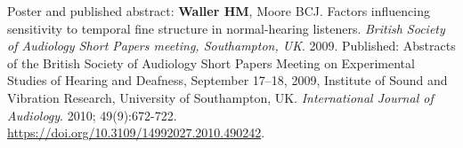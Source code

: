 \documentclass[a4paper, oneside, final, 11pt]{scrartcl} %
\begin{document}
\bigskip

Poster and published abstract: \textbf{Waller HM}, Moore BCJ. Factors influencing sensitivity to temporal fine structure in normal-hearing listeners. \textit{British Society of Audiology Short Papers meeting, Southampton, UK}. 2009. Published: Abstracts of the British Society of Audiology Short Papers Meeting on Experimental Studies of Hearing and Deafness, September 17--18, 2009, Institute of Sound and Vibration Research, University of Southampton, UK. \textit{International Journal of Audiology}. 2010; 49(9):672-722. \\\url{https://doi.org/10.3109/14992027.2010.490242}.
\end{document}
